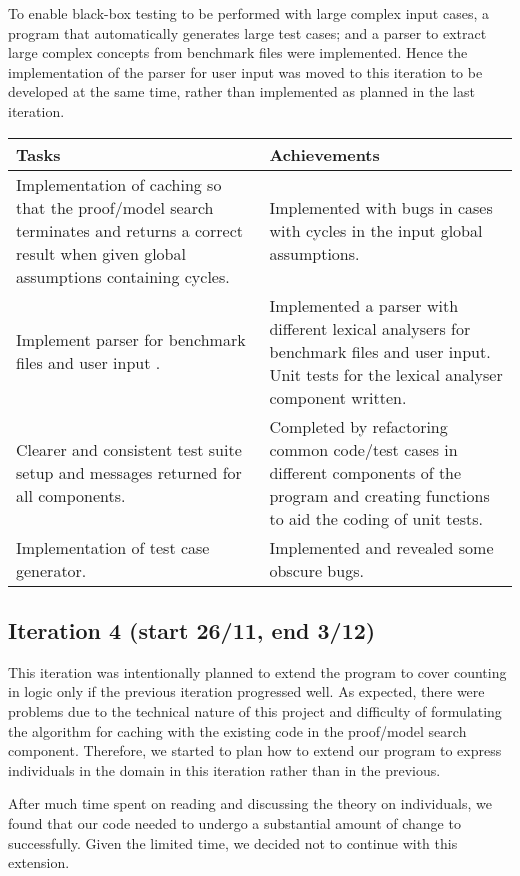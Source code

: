 To enable black-box testing to be performed with large complex input cases, a program that automatically generates large test cases; and a parser to extract large complex concepts from benchmark files were implemented. Hence the implementation of the parser for user input was moved to this iteration to be developed at the same time, rather than implemented as planned in the last iteration.

\begin{center}
\begin{longtable}{| p{7cm} | p{8cm} |}
\hline
\textbf{Tasks} & \textbf{Achievements} \\
\hline
Implementation of caching so that the proof/model search terminates and returns a correct result when given global assumptions containing cycles. & Implemented with bugs in cases with cycles in the input global assumptions.\\
\hline
Implement parser for benchmark files and user input	. & Implemented a parser with different lexical analysers for benchmark files and user input. Unit tests for the lexical analyser component written.\\
\hline
Clearer and consistent test suite setup and messages returned for all components. & Completed by refactoring common code/test cases in different components of the program and creating functions to aid the coding of unit tests.\\
\hline
Implementation of test case generator. & Implemented and revealed some obscure bugs.\\
\hline
\end{longtable}
\end{center}

\subsection*{Iteration 4 (start 26/11, end 3/12)}

This iteration was intentionally planned to extend the program to cover counting in logic only if the previous iteration progressed well. As expected, there were problems due to the technical nature of this project and difficulty of formulating the algorithm for caching with the existing code in the proof/model search component. Therefore, we started to plan how to extend our program to express individuals in the domain in this iteration rather than in the previous.

After much time spent on reading and discussing the theory on individuals, we found that our code needed to undergo a substantial amount of change to successfully. Given the limited time, we decided not to continue with this extension.

